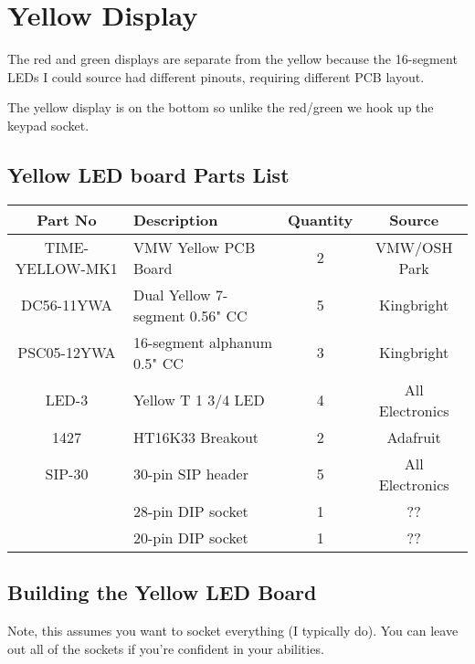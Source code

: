 \documentclass[11pt]{article}
\begin{document}
\section{Yellow Display}

The red and green displays are separate from the yellow because
the 16-segment LEDs I could source had different pinouts, requiring
different PCB layout.

The yellow display is on the bottom so unlike the red/green we
hook up the keypad socket.

\subsection{Yellow LED board Parts List}

\begin{tabular}{|c|l|c|c|}
\hline
Part No   &  Description    &  Quantity    &   Source \\
\hline
\hline
TIME-YELLOW-MK1& VMW Yellow PCB Board          & 2 & VMW/OSH Park\\ %
\hline
DC56-11YWA     & Dual Yellow 7-segment 0.56" CC& 5 & Kingbright\\ %
\hline
PSC05-12YWA    & 16-segment alphanum 0.5" CC   & 3 & Kingbright\\ %
\hline
LED-3          & Yellow T 1 3/4 LED            & 4 & All Electronics\\ %
\hline
1427           & HT16K33 Breakout              & 2 & Adafruit\\ %
\hline
SIP-30	       & 30-pin SIP header             & 5 & All Electronics\\ %
\hline
               & 28-pin DIP socket             & 1 & ?? \\ %
\hline
               & 20-pin DIP socket             & 1 & ?? \\ %
\hline
\end{tabular}


\subsection{Building the Yellow LED Board}

Note, this assumes you want to socket everything (I typically do).
You can leave out all of the sockets if you're confident in your
abilities.
\end{document}
